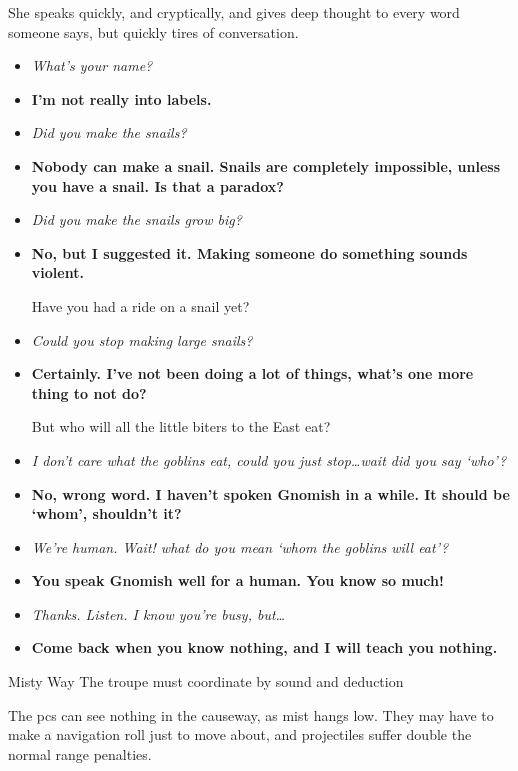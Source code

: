 \begin{multicols}{2}
She speaks quickly, and cryptically, and gives deep thought to every word someone says, but quickly tires of conversation.

\begin{itemize}
  \item\it
  What's your name?
  \item[\adforn{54}]\bf
  I'm not really into labels.
  \item\it
  Did you make the snails?
  \item[\adforn{54}]\bf
  Nobody can make a snail.
  Snails are completely impossible, unless you have a snail.
  Is that a paradox?
  \item\it
  Did you make the snails grow big?
  \item[\adforn{54}]\bf
  No, but I suggested it.
  Making someone do something sounds violent.

  Have you had a ride on a snail yet?
  \item\it
  Could you stop making large snails?
  \item[\adforn{54}]\bf
  Certainly.
  I've not been doing a lot of things, what's one more thing to not do?

  But who will all the little biters to the East eat?
  \item\it
  I don't care what the goblins eat, could you just stop\ldots wait did you say `who'?
  \item[\adforn{54}]\bf
  No, wrong word.
  I haven't spoken Gnomish in a while.
  It should be `whom', shouldn't it?
  \item\it
  We're human.
  Wait! what do you mean `whom the goblins will eat'?
  \item[\adforn{54}]\bf
  You speak Gnomish well for a human.
  You know so much!
  \item\it
  Thanks.
  Listen.
  I know you're busy, but\ldots
  \item[\adforn{54}]\bf
  Come back when you know nothing, and I will teach you nothing.
\end{itemize}

\LifeElder

\showStdSpells

{Misty Way}%
{The troupe must coordinate by sound and deduction}%

The \glspl{pc} can see nothing in the causeway, as mist hangs low.
They may have to make a navigation roll just to move about, and projectiles suffer double the normal range penalties.


\end{multicols}
